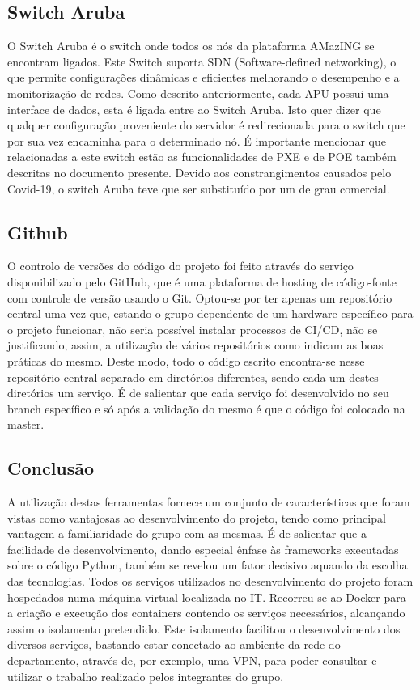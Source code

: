 \subsection{Switch Aruba}
O Switch Aruba é o switch onde todos os nós da plataforma AMazING se encontram ligados. Este Switch suporta SDN (Software-defined networking), o que permite configurações dinâmicas e eficientes melhorando o desempenho e a monitorização de redes.\newline
Como descrito anteriormente, cada APU possui uma interface de dados, esta é ligada entre ao Switch Aruba. Isto quer dizer que qualquer configuração proveniente do servidor é redirecionada para o switch que por sua vez encaminha para o determinado nó.\newline
É importante mencionar que relacionadas a este switch estão as funcionalidades de PXE e de POE também descritas no documento presente.\newline
Devido aos constrangimentos causados pelo Covid-19, o switch Aruba teve que ser substituído por um de grau comercial.


\subsection{Github}
O controlo de versões do código do projeto foi feito através do serviço disponibilizado pelo GitHub, que é uma plataforma de hosting de código-fonte com controle de versão usando o Git.\newline
Optou-se por ter apenas um repositório central uma vez que, estando o grupo dependente de um hardware específico para o projeto funcionar, não seria possível instalar processos de CI/CD, não se justificando, assim, a utilização de vários repositórios como indicam as boas práticas do mesmo. Deste modo, todo o código escrito encontra-se nesse repositório central separado em diretórios diferentes, sendo cada um destes diretórios um serviço. É de salientar que cada serviço foi desenvolvido no seu branch específico e só após a validação do mesmo é que o código foi colocado na master.

\subsection{Conclusão}
A utilização destas ferramentas fornece um conjunto de características que foram vistas como vantajosas ao desenvolvimento do projeto, tendo como principal vantagem a familiaridade do grupo com as mesmas. É de salientar que a facilidade de desenvolvimento, dando especial ênfase às frameworks executadas sobre o código Python, também se revelou um fator decisivo aquando da escolha das tecnologias.\newline
Todos os serviços utilizados no desenvolvimento do projeto foram hospedados numa máquina virtual localizada no IT. Recorreu-se ao Docker para a criação e execução dos containers contendo os serviços necessários, alcançando assim o isolamento pretendido. Este isolamento facilitou o desenvolvimento dos diversos serviços,  bastando estar conectado ao ambiente da rede do departamento, através de, por exemplo, uma VPN, para poder consultar e utilizar o trabalho realizado pelos integrantes do grupo.